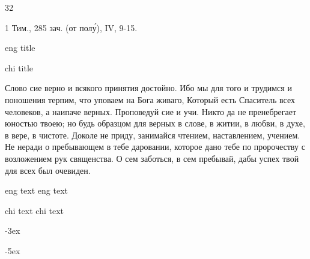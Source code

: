 32

\onehalfspacing %

\doublespacing %

\Large%

1 Тим., 285 зач. (от полу́), IV, 9-15.

eng title

chi title

Слово сие верно и всякого принятия достойно.
Ибо мы для того и трудимся и поношения терпим, что уповаем на Бога живаго, Который есть Спаситель всех человеков, а наипаче верных.
Проповедуй сие и учи.
Никто да не пренебрегает юностью твоею; но будь образцом для верных в слове, в житии, в любви, в духе, в вере, в чистоте.
Доколе не приду, занимайся чтением, наставлением, учением.
Не неради о пребывающем в тебе даровании, которое дано тебе по пророчеству с возложением рук священства.
О сем заботься, в сем пребывай, дабы успех твой для всех был очевиден. 

eng text
eng text

chi text
chi text

\Huge%

-3ex%

-5ex%

